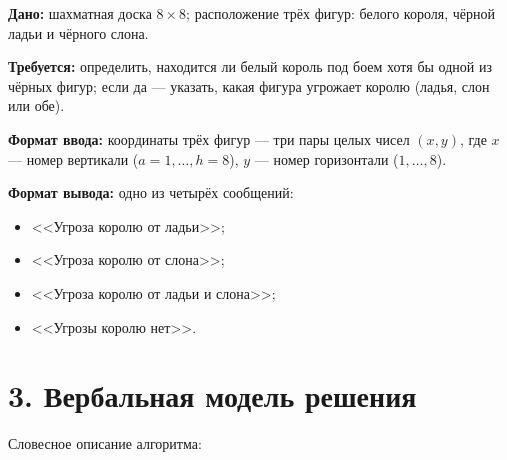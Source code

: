 \documentclass[12pt,a4paper]{article}
\begin{document}
\textbf{Дано:} шахматная доска $8\times 8$; расположение трёх фигур:
белого короля, чёрной ладьи и чёрного слона.

\textbf{Требуется:} определить, находится ли белый король под боем
хотя бы одной из чёрных фигур; если да --- указать, какая фигура
угрожает королю (ладья, слон или обе).

\textbf{Формат ввода:} координаты трёх фигур --- три пары целых чисел
$(x, y)$, где $x$ --- номер вертикали ($a=1,\ldots,h=8$), $y$ --- номер
горизонтали ($1,\ldots,8$).

\textbf{Формат вывода:} одно из четырёх сообщений:
\begin{itemize}[nosep]
  \item <<Угроза королю от ладьи>>;
  \item <<Угроза королю от слона>>;
  \item <<Угроза королю от ладьи и слона>>;
  \item <<Угрозы королю нет>>.
\end{itemize}

\section*{3. Вербальная модель решения}

Словесное описание алгоритма:
\end{document}
